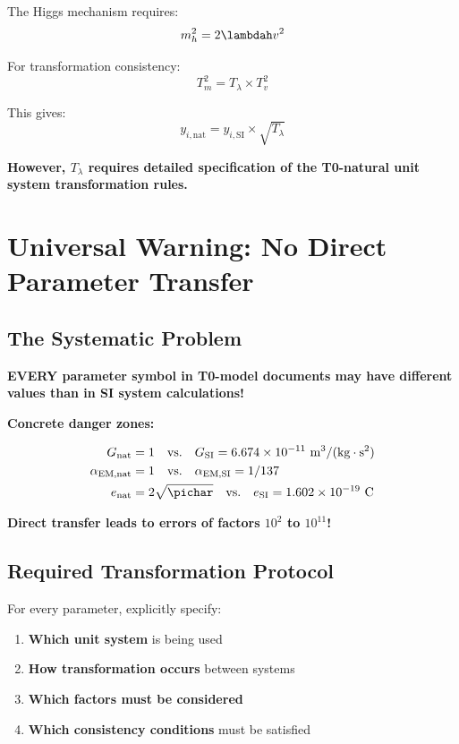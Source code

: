 	The Higgs mechanism requires:
	$$m_h^2 = 2\lambdah v^2$$
	
	For transformation consistency:
	$$T_m^2 = T_\lambda \times T_v^2$$
	
	This gives:
	$$y_{i,\text{nat}} = y_{i,\text{SI}} \times \sqrt{T_\lambda}$$
	
	\textbf{However, $T_\lambda$ requires detailed specification of the T0-natural unit system transformation rules.}
	
	\section{Universal Warning: No Direct Parameter Transfer}
	\label{sec:universal_warning}
	
	\subsection{The Systematic Problem}
	\label{subsec:systematic_problem}
	
	\begin{warning}
		\textbf{EVERY parameter symbol in T0-model documents may have different values than in SI system calculations!}
	\end{warning}
	
	\textbf{Concrete danger zones:}
	
	\begin{align}
		G_{\text{nat}} &= 1 \quad \text{vs.} \quad G_{\text{SI}} = 6.674 \times 10^{-11} \text{ m}^3/(\text{kg} \cdot \text{s}^2) \\
		\alpha_{\text{EM,nat}} &= 1 \quad \text{vs.} \quad \alpha_{\text{EM,SI}} = 1/137 \\
		e_{\text{nat}} &= 2\sqrt{\pichar} \quad \text{vs.} \quad e_{\text{SI}} = 1.602 \times 10^{-19} \text{ C}
	\end{align}
	
	\textbf{Direct transfer leads to errors of factors $10^2$ to $10^{11}$!}
	
	\subsection{Required Transformation Protocol}
	\label{subsec:transformation_protocol}
	
	For every parameter, explicitly specify:
	
	\begin{enumerate}
		\item \textbf{Which unit system} is being used
		\item \textbf{How transformation occurs} between systems
		\item \textbf{Which factors must be considered}
		\item \textbf{Which consistency conditions} must be satisfied
	\end{enumerate}
	
